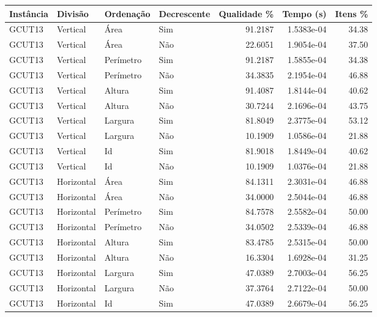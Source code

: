 \begin{tabular}{llllrrr}
\hline
Instância & Divisão     & Ordenação & Decrescente & Qualidade \% & Tempo (s)  & Itens \% \\
\hline
GCUT13    & Vertical    & Área      & Sim         & 91.2187      & 1.5383e-04 & 34.38    \\
GCUT13    & Vertical    & Área      & Não         & 22.6051      & 1.9054e-04 & 37.50    \\
GCUT13    & Vertical    & Perímetro & Sim         & 91.2187      & 1.5855e-04 & 34.38    \\
GCUT13    & Vertical    & Perímetro & Não         & 34.3835      & 2.1954e-04 & 46.88    \\
GCUT13    & Vertical    & Altura    & Sim         & 91.4087      & 1.8144e-04 & 40.62    \\
GCUT13    & Vertical    & Altura    & Não         & 30.7244      & 2.1696e-04 & 43.75    \\
GCUT13    & Vertical    & Largura   & Sim         & 81.8049      & 2.3775e-04 & 53.12    \\
GCUT13    & Vertical    & Largura   & Não         & 10.1909      & 1.0586e-04 & 21.88    \\
GCUT13    & Vertical    & Id        & Sim         & 81.9018      & 1.8449e-04 & 40.62    \\
GCUT13    & Vertical    & Id        & Não         & 10.1909      & 1.0376e-04 & 21.88    \\
GCUT13    & Horizontal  & Área      & Sim         & 84.1311      & 2.3031e-04 & 46.88    \\
GCUT13    & Horizontal  & Área      & Não         & 34.0000      & 2.5044e-04 & 46.88    \\
GCUT13    & Horizontal  & Perímetro & Sim         & 84.7578      & 2.5582e-04 & 50.00    \\
GCUT13    & Horizontal  & Perímetro & Não         & 34.0502      & 2.5339e-04 & 46.88    \\
GCUT13    & Horizontal  & Altura    & Sim         & 83.4785      & 2.5315e-04 & 50.00    \\
GCUT13    & Horizontal  & Altura    & Não         & 16.3304      & 1.6928e-04 & 31.25    \\
GCUT13    & Horizontal  & Largura   & Sim         & 47.0389      & 2.7003e-04 & 56.25    \\
GCUT13    & Horizontal  & Largura   & Não         & 37.3764      & 2.7122e-04 & 50.00    \\
GCUT13    & Horizontal  & Id        & Sim         & 47.0389      & 2.6679e-04 & 56.25    \\

\end{tabular}
